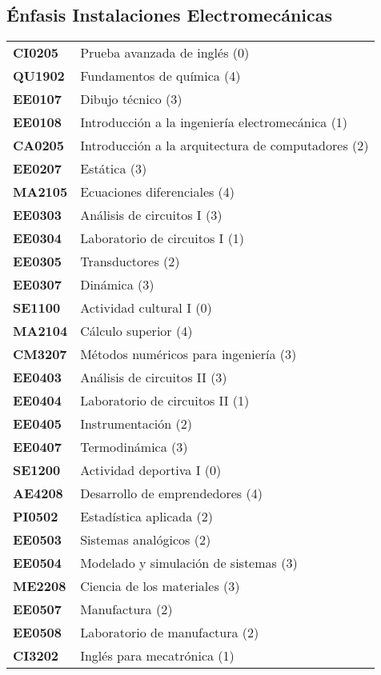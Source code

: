 \documentclass[letterpaper]{article}%
\begin{document}
\subsection*{Énfasis Instalaciones Electromecánicas}%
\label{subsec:nfasisInstalacionesElectromecnicas}%
\begin{tabularx}{\textwidth}{p{1.5cm}p{10cm}}%
\textbf{CI0205}&Prueba avanzada de inglés (0)\\%
\textbf{QU1902}&Fundamentos de química (4)\\%
\textbf{EE0107}&Dibujo técnico (3)\\%
\textbf{EE0108}&Introducción a la ingeniería electromecánica (1)\\%
\textbf{CA0205}&Introducción a la arquitectura de computadores (2)\\%
\textbf{EE0207}&Estática (3)\\%
\textbf{MA2105}&Ecuaciones diferenciales (4)\\%
\textbf{EE0303}&Análisis de circuitos I (3)\\%
\textbf{EE0304}&Laboratorio de circuitos I (1)\\%
\textbf{EE0305}&Transductores (2)\\%
\textbf{EE0307}&Dinámica (3)\\%
\textbf{SE1100}&Actividad cultural I (0)\\%
\textbf{MA2104}&Cálculo superior (4)\\%
\textbf{CM3207}&Métodos numéricos para ingeniería (3)\\%
\textbf{EE0403}&Análisis de circuitos II (3)\\%
\textbf{EE0404}&Laboratorio de circuitos II (1)\\%
\textbf{EE0405}&Instrumentación (2)\\%
\textbf{EE0407}&Termodinámica (3)\\%
\textbf{SE1200}&Actividad deportiva I (0)\\%
\textbf{AE4208}&Desarrollo de emprendedores (4)\\%
\textbf{PI0502}&Estadística aplicada (2)\\%
\textbf{EE0503}&Sistemas analógicos (2)\\%
\textbf{EE0504}&Modelado y simulación de sistemas (3)\\%
\textbf{ME2208}&Ciencia de los materiales (3)\\%
\textbf{EE0507}&Manufactura (2)\\%
\textbf{EE0508}&Laboratorio de manufactura (2)\\%
\textbf{CI3202}&Inglés para mecatrónica (1)\\%

\end{tabularx}
\end{document}
